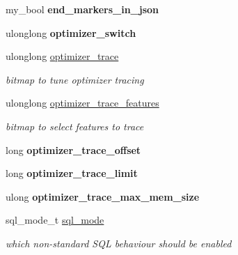 \begin{DoxyCompactItemize}
\mbox{\label{structsystem__variables_aacb860576add46d0ddae5c472f4cec13}} 
my\+\_\+bool {\bfseries end\+\_\+markers\+\_\+in\+\_\+json}
\item 
\mbox{\label{structsystem__variables_ad9d11ffad59362ef1b049acd8130d2e1}} 
ulonglong {\bfseries optimizer\+\_\+switch}
\item 
\mbox{\label{structsystem__variables_a885b8367335d72fa20b96c15299e84fe}} 
ulonglong \mbox{\hyperlink{structsystem__variables_a885b8367335d72fa20b96c15299e84fe}{optimizer\+\_\+trace}}
\begin{DoxyCompactList}\small\item\em bitmap to tune optimizer tracing \end{DoxyCompactList}\item 
\mbox{\label{structsystem__variables_afb344b6d5243a551afd58289f94dfdc5}} 
ulonglong \mbox{\hyperlink{structsystem__variables_afb344b6d5243a551afd58289f94dfdc5}{optimizer\+\_\+trace\+\_\+features}}
\begin{DoxyCompactList}\small\item\em bitmap to select features to trace \end{DoxyCompactList}\item 
\mbox{\label{structsystem__variables_a206a31c47737e191d7026bac47b1cc89}} 
long {\bfseries optimizer\+\_\+trace\+\_\+offset}
\item 
\mbox{\label{structsystem__variables_a63665064ca3dfbc1506c1cf5f4862a33}} 
long {\bfseries optimizer\+\_\+trace\+\_\+limit}
\item 
\mbox{\label{structsystem__variables_a66e888a43b3f5739701467d833db66ff}} 
ulong {\bfseries optimizer\+\_\+trace\+\_\+max\+\_\+mem\+\_\+size}
\item 
\mbox{\label{structsystem__variables_a2c95143a1f46cb1e88fd6f9785ac739c}} 
sql\+\_\+mode\+\_\+t \mbox{\hyperlink{structsystem__variables_a2c95143a1f46cb1e88fd6f9785ac739c}{sql\+\_\+mode}}
\begin{DoxyCompactList}\small\item\em which non-\/standard S\+QL behaviour should be enabled \end{DoxyCompactList}\item 

\end{DoxyCompactItemize}
